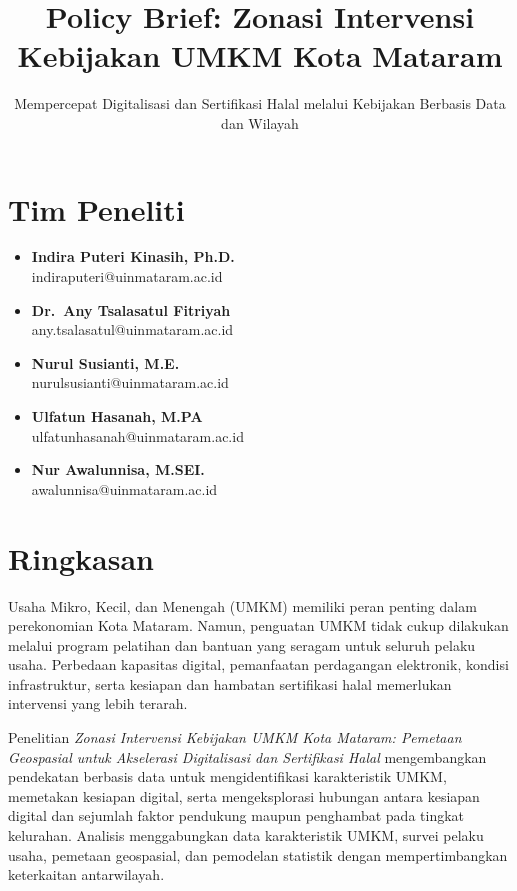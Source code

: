 \documentclass[
  indonesian,
  11pt,
  a4paper,
]{report}
\title{Policy Brief: Zonasi Intervensi Kebijakan UMKM Kota Mataram}
\subtitle{Mempercepat Digitalisasi dan Sertifikasi Halal melalui
Kebijakan Berbasis Data dan Wilayah}
\author{}
\date{}
\begin{document}
\maketitle


\chapter*{Tim Peneliti}\label{tim-peneliti}

\begin{itemize}
\item
  \textbf{Indira Puteri Kinasih, Ph.D.}\\
  indiraputeri@uinmataram.ac.id
\item
  \textbf{Dr.~Any Tsalasatul Fitriyah}\\
  any.tsalasatul@uinmataram.ac.id
\item
  \textbf{Nurul Susianti, M.E.}\\
  nurulsusianti@uinmataram.ac.id
\item
  \textbf{Ulfatun Hasanah, M.PA}\\
  ulfatunhasanah@uinmataram.ac.id
\item
  \textbf{Nur Awalunnisa, M.SEI.}\\
  awalunnisa@uinmataram.ac.id
\end{itemize}

\newpage

\chapter*{Ringkasan}\label{ringkasan}

Usaha Mikro, Kecil, dan Menengah (UMKM) memiliki peran penting dalam
perekonomian Kota Mataram. Namun, penguatan UMKM tidak cukup dilakukan
melalui program pelatihan dan bantuan yang seragam untuk seluruh pelaku
usaha. Perbedaan kapasitas digital, pemanfaatan perdagangan elektronik,
kondisi infrastruktur, serta kesiapan dan hambatan sertifikasi halal
memerlukan intervensi yang lebih terarah.

Penelitian \emph{Zonasi Intervensi Kebijakan UMKM Kota Mataram: Pemetaan
Geospasial untuk Akselerasi Digitalisasi dan Sertifikasi Halal}
mengembangkan pendekatan berbasis data untuk mengidentifikasi
karakteristik UMKM, memetakan kesiapan digital, serta mengeksplorasi
hubungan antara kesiapan digital dan sejumlah faktor pendukung maupun
penghambat pada tingkat kelurahan. Analisis menggabungkan data
karakteristik UMKM, survei pelaku usaha, pemetaan geospasial, dan
pemodelan statistik dengan mempertimbangkan keterkaitan antarwilayah.
\end{document}
